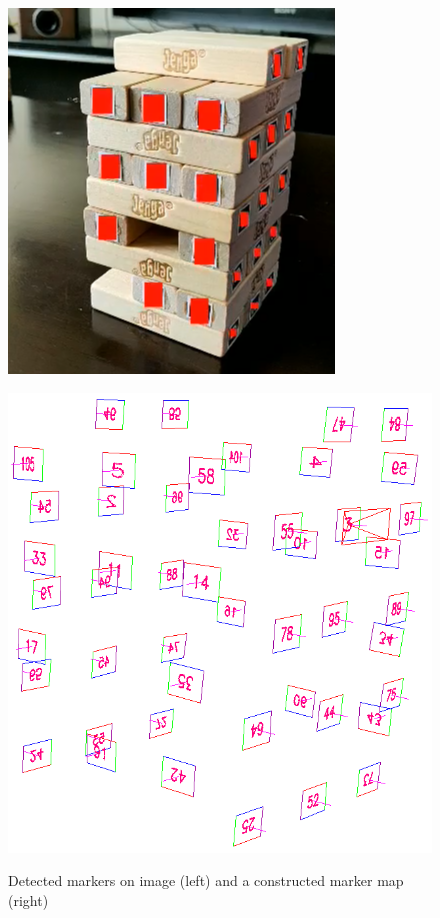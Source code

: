 \begin{figure}[ht]
\begin{minipage}{.45\textwidth}
    \includegraphics[width=\textwidth]{images/implementation/detection.png}
    \label{fig:detectedmarkers}
\end{minipage}\hfill
\begin{minipage}{.45\textwidth}
    \includegraphics[width=\textwidth]{images/implementation/map}
    \label{fig:markermap}
\end{minipage}
\caption{Detected markers on image (left) and a constructed marker map (right)}
\label{fig:markersandmap}
\end{figure}

